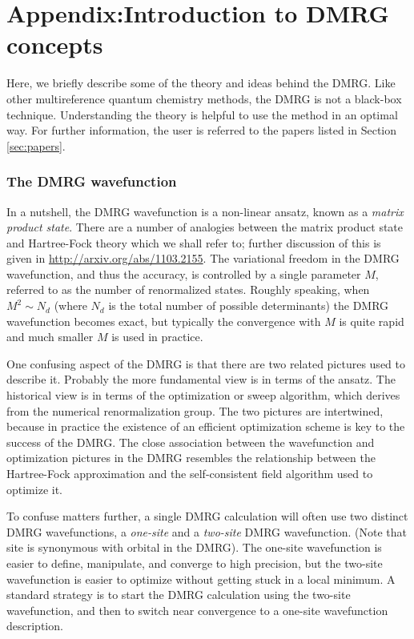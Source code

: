 \documentclass[letterpaper,12pt,aps, pra]{revtex4-1}
\begin{document}
\newpage

\section{Appendix:Introduction to DMRG concepts}\label{sec:appendix1}

Here, we briefly describe some of the theory and ideas behind the DMRG. 
Like other multireference quantum chemistry methods, the DMRG
is not a black-box technique. Understanding the theory is helpful
to use the method in an optimal way. For further information, the
 user is referred to the papers listed in Section \ref{sec:papers}.

\subsubsection{The DMRG wavefunction}

In a nutshell, the DMRG wavefunction is a non-linear ansatz, known as a {\it
matrix product state}.  There are a number of analogies between the matrix
product state and Hartree-Fock theory which we shall refer to; further
discussion of this is given in \url{http://arxiv.org/abs/1103.2155}.  The
variational freedom in the DMRG wavefunction, and thus the accuracy, is
controlled by a single parameter $M$, referred to as the number of renormalized
states.  Roughly speaking, when $M^2 \sim N_d$ (where $N_d$ is the total number
of possible determinants) the DMRG wavefunction becomes exact, but typically
the convergence with $M$ is quite rapid and much smaller $M$ is used in
practice. 

One confusing aspect of the DMRG is that there are two related
pictures used to describe it. Probably the more fundamental view is in
terms of the ansatz.
The historical view is in terms of the optimization or sweep algorithm,
 which derives from the numerical renormalization group.
The two pictures are intertwined, because
in practice the existence of an efficient optimization scheme is
key to the success of the DMRG. The close association between the wavefunction and optimization pictures in the DMRG
resembles the relationship between the Hartree-Fock approximation and the
self-consistent field algorithm used to optimize it.

To confuse matters further, a single DMRG calculation will often use two distinct DMRG wavefunctions, a {\it one-site} and a {\it two-site}
DMRG wavefunction. (Note that site is synonymous with orbital in the DMRG). The one-site
 wavefunction is easier to define, manipulate, and converge to high precision, but the two-site wavefunction is
easier to optimize without getting stuck in a local minimum. A standard strategy is 
to start the DMRG calculation using the two-site wavefunction, and then to switch near convergence to a 
one-site wavefunction description.
\end{document}
